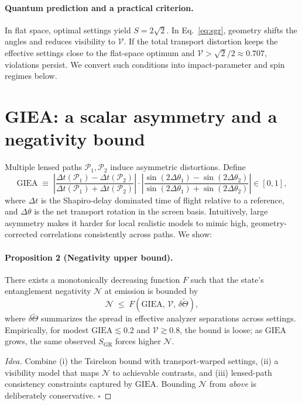 \documentclass[11pt]{article}
\begin{document}
\paragraph{Quantum prediction and a practical criterion.} In flat space, optimal settings yield \(S=2\sqrt 2\). In Eq.~\eqref{eq:sgr}, geometry shifts the angles and reduces visibility to \(\mathcal{V}\). If the total transport distortion keeps the effective settings close to the flat-space optimum and \(\mathcal{V}>\sqrt{2}/2\approx 0.707\), violations persist. We convert such conditions into impact-parameter and spin regimes below.

\section{GIEA: a scalar asymmetry and a negativity bound}
Multiple lensed paths \(\mathcal{P}_1,\mathcal{P}_2\) induce asymmetric distortions. Define
\begin{equation}
  \mathrm{GIEA} \;\equiv\; \left|\frac{\Delta t(\mathcal{P}_1)-\Delta t(\mathcal{P}_2)}{\Delta t(\mathcal{P}_1)+\Delta t(\mathcal{P}_2)}\right|\cdot
  \left|\frac{\sin(2\Delta\theta_1)-\sin(2\Delta\theta_2)}{\sin(2\Delta\theta_1)+\sin(2\Delta\theta_2)}\right| \in [0,1],
\end{equation}
where \(\Delta t\) is the Shapiro-delay dominated time of flight relative to a reference, and \(\Delta\theta\) is the net transport rotation in the screen basis. Intuitively, large asymmetry makes it harder for local realistic models to mimic high, geometry-corrected correlations consistently across paths. We show:
\paragraph{Proposition 2 (Negativity upper bound).}
There exists a monotonically decreasing function \(F\) such that the state's entanglement negativity \(\mathcal{N}\) at emission is bounded by
\begin{equation}
  \mathcal{N} \;\le\; F\!\left(\mathrm{GIEA},\, \mathcal{V},\, \delta\tilde\Theta\right),
\end{equation}
where \(\delta\tilde\Theta\) summarizes the spread in effective analyzer separations across settings. Empirically, for modest \(\mathrm{GIEA}\lesssim 0.2\) and \(\mathcal{V}\gtrsim 0.8\), the bound is loose; as \(\mathrm{GIEA}\) grows, the same observed \(S_{\mathrm{GR}}\) forces higher \(\mathcal{N}\).
\begin{proof}[Idea]
Combine (i) the Tsirelson bound with transport-warped settings, (ii) a visibility model that maps \(\mathcal{N}\) to achievable contrasts, and (iii) lensed-path consistency constraints captured by \(\mathrm{GIEA}\). Bounding \(\mathcal{N}\) from \emph{above} is deliberately conservative. \(\square\)
\end{proof}
\end{document}
